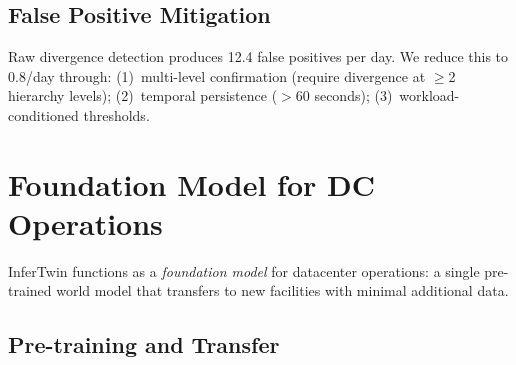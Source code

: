 \documentclass[conference,10pt]{IEEEtran}
\begin{document}
\begin{table}[!htbp]
\caption{Anomaly Detection Lead Time vs.\ Conventional Monitoring}
\label{tab:anomaly}
\centering\scriptsize
{}
\end{table}

\subsection{False Positive Mitigation}

Raw divergence detection produces 12.4 false positives per day. We reduce this to 0.8/day through: (1)~multi-level confirmation (require divergence at $\geq$2 hierarchy levels); (2)~temporal persistence ($>$60 seconds); (3)~workload-conditioned thresholds.

\section{Foundation Model for DC Operations}
\label{sec:foundation}

InferTwin functions as a \emph{foundation model} for datacenter operations: a single pre-trained world model that transfers to new facilities with minimal additional data.

\subsection{Pre-training and Transfer}
\end{document}
